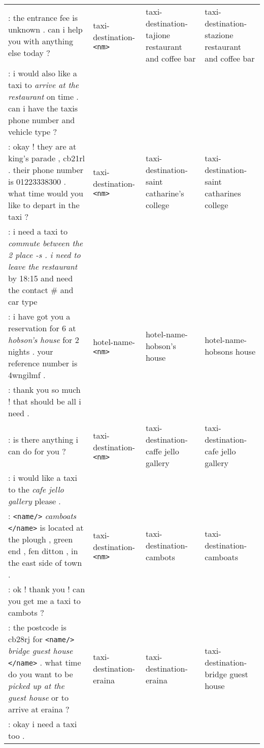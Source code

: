 \documentclass[11pt]{article}
\begin{document}
\begin{table*}
\begin{tabular}{p{6cm}|p{2.5cm}|p{3cm}|p{3cm}}
\midrule
: the entrance fee is unknown . can i help you with anything else today ? & taxi-destination-\texttt{<nm>} & taxi-destination-tajione restaurant and coffee bar & taxi-destination-stazione restaurant and coffee bar \\
: i would also like a taxi to \textcolor{my_blue}{\textit{arrive at the restaurant}} on time . can i have the taxis phone number and vehicle type ? & & & \\
\midrule
: okay ! they are at king's parade , cb21rl . their phone number is 01223338300 . what time would you like to depart in the taxi ? & taxi-destination-\texttt{<nm>} & taxi-destination-saint catharine's college & taxi-destination-saint catharines college \\
: i need a taxi to \textcolor{my_blue}{\textit{commute between the 2 place -s . i need to leave the restaurant}} by 18:15 and need the contact \# and car type & & & \\
\midrule
: i have got you a reservation for 6 at \textcolor{my_blue}{\textit{hobson's house}} for 2 nights . your reference number is 4wngilmf . & hotel-name-\texttt{<nm>} & hotel-name-hobson's house & hotel-name-hobsons house \\
: thank you so much ! that should be all i need . & & & \\
\midrule
: is there anything i can do for you ? & taxi-destination-\texttt{<nm>} & taxi-destination-caffe jello gallery & taxi-destination-cafe jello gallery \\
: i would like a taxi to the \textcolor{my_blue}{\textit{cafe jello gallery}} please . & & & \\
\midrule
: \texttt{<name/>} \textcolor{my_blue}{\textit{camboats}} \texttt{</name>} is located at the plough , green end , fen ditton , in the east side of town . & taxi-destination-\texttt{<nm>} & taxi-destination-cambots & taxi-destination-camboats \\
: ok ! thank you ! can you get me a taxi to cambots ? & & & \\
\midrule
: the postcode is cb28rj for \texttt{<name/>} \textcolor{my_blue}{\textit{bridge guest house}} \texttt{</name>} . what time do you want to be \textcolor{my_blue}{\textit{picked up at the guest house}} or to arrive at eraina ? & taxi-destination-eraina & taxi-destination-eraina & taxi-destination-bridge guest house \\
: okay i need a taxi too . & & & \\
\bottomrule
\end{tabular}
\caption{Examples of the amending generation. The key information in the dialogue is shown in blue.}\label{tab:case-study}
\end{table*}
\end{document}
